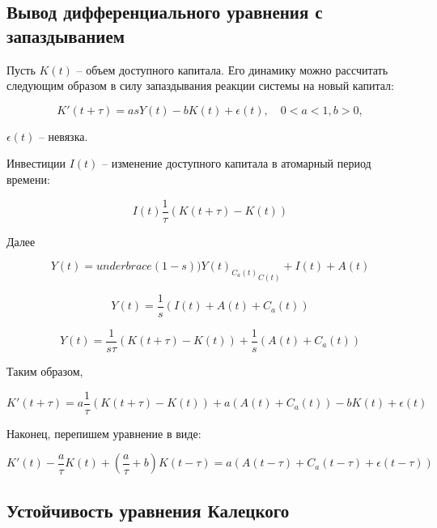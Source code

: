 \subsection{Вывод дифференциального уравнения с запаздыванием}

Пусть $K(t)$ \--- объем доступного капитала. Его динамику можно рассчитать следующим образом в силу запаздывания реакции системы на новый капитал:

\begin{equation}
K'(t + \tau) = a s Y(t) - b K(t) + \epsilon(t), \quad 0 < a < 1, b > 0,
\end{equation}

$\epsilon(t)$ \--- невязка.

Инвестиции $I(t)$ \--- изменение доступного капитала в атомарный период времени:

\begin{equation}
I(t) \dfrac{1}{\tau} \left( K(t+\tau) - K(t) \right)
\end{equation}

Далее

\begin{equation}
Y(t) = {underbrace{(1-s)) Y(t)}_{C_a(t)}}_{C(t)} + I(t) + A(t)
\end{equation}

\begin{equation}
Y(t) = \dfrac{1}{s} \left( I(t) + A(t) + C_a(t) \right)
\end{equation}

\begin{equation}
Y(t) = \dfrac{1}{s \tau} \left( K(t+\tau) - K(t) \right) + \dfrac{1}{s} \left( A(t) + C_a(t) \right)
\end{equation}

Таким образом,

\begin{equation}
K'(t + \tau) = a \dfrac{1}{\tau} \left( K(t+\tau) - K(t) \right) + a \left( A(t) + C_a(t) \right) - bK(t) + \epsilon(t)
\end{equation}

Наконец, перепишем уравнение в виде:

\begin{equation}\label{eq:Kalecki}
K'(t) - \dfrac{a}{\tau} K(t) + \left( \dfrac{a}{\tau} + b \right) K(t-\tau) = a (A(t-\tau) + C_a(t-\tau) + \epsilon(t-\tau))
\end{equation}

\subsection{Устойчивость уравнения Калецкого}

